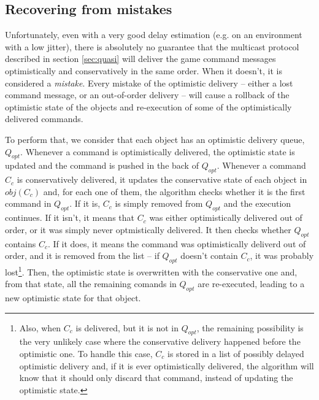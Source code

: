 \documentclass[times, 10pt]{article}
\begin{document}


\subsection{Recovering from mistakes}

Unfortunately, even with a very good delay estimation (e.g. on an environment with a low jitter), there is absolutely no guarantee that the multicast protocol described  in section \ref{sec:quasi} will deliver the game command messages optimistically and conservatively in the same order. When it doesn't, it is considered a \emph{mistake}. Every mistake of the optimistic delivery -- either a lost command message, or an out-of-order delivery -- will cause a rollback of the optimistic state of the objects and re-execution of some of the optimistically delivered commands.

To perform that, we consider that each object has an optimistic delivery queue, $Q_{opt}$. Whenever a command is optimistically delivered, the optimistic state is updated and the command is pushed in the back of $Q_{opt}$. Whenever a command $C_c$ is conservatively delivered, it updates the conservative state of each object in $obj(C_c)$ and, for each one of them, the algorithm checks whether it is the first command in $Q_{opt}$. If it is, $C_c$ is simply removed from $Q_{opt}$ and the execution continues. If it isn't, it means that $C_c$ was either optimistically delivered out of order, or it was simply never optmistically delivered. It then checks whether $Q_{opt}$ contains $C_c$. If it does, it means the command was optimistically deliverd out of order, and it is removed from the list -- if $Q_{opt}$ doesn't contain $C_c$, it was probably lost\footnote{Also, when $C_c$ is delivered, but it is not in $Q_{opt}$, the remaining possibility is the very unlikely case where the conservative delivery happened before the optimistic one. To handle this case, $C_c$ is stored in a list of possibly delayed optimistic delivery and, if it is ever optimistically delivered, the algorithm will know that it should only discard that command, instead of updating the optimistic state.}. Then, the optimistic state is overwritten with the conservative one and, from that state, all the remaining comands in $Q_{opt}$ are re-executed, leading to a new optimistic state for that object.


%
%


\end{document}
